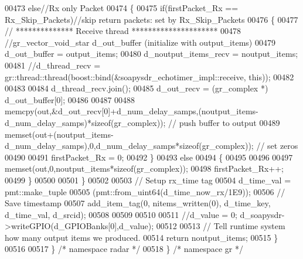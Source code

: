 \begin{DoxyCode}
00473       \textcolor{keywordflow}{else}\textcolor{comment}{//Rx only Packet}
00474       \{
00475         \textcolor{keywordflow}{if}(firstPacket_Rx == Rx_Skip_Packets)\textcolor{comment}{//skip return packets: set by Rx\_Skip\_Packets}
00476         \{
00477           \textcolor{comment}{// ************** Receive thread *********************}
00478           \textcolor{comment}{//gr\_vector\_void\_star d\_out\_buffer (initialize with output\_items)}
00479           d_out_buffer = output\_items;
00480           d_noutput_items_recv = noutput\_items;
00481           \textcolor{comment}{//d\_thread\_recv = gr::thread::thread(boost::bind(&soapysdr\_echotimer\_impl::receive, this));}
00482 
00483 
00484           d_thread_recv.join();
00485           d_out_recv = (gr\_complex *) d_out_buffer[0];
00486 
00487 
00488           memcpy(out,&d_out_recv[0]+d_num_delay_samps,(noutput\_items-
      d_num_delay_samps)*\textcolor{keyword}{sizeof}(gr\_complex)); \textcolor{comment}{// push buffer to output}
00489           memset(out+(noutput\_items-d_num_delay_samps),0,d_num_delay_samps*\textcolor{keyword}{sizeof}(gr\_complex)); \textcolor{comment}{// set
       zeros}
00490 
00491           firstPacket_Rx = 0;
00492         \}
00493         \textcolor{keywordflow}{else}
00494         \{
00495 
00496 
00497           memset(out,0,noutput\_items*\textcolor{keyword}{sizeof}(gr\_complex));
00498           firstPacket_Rx++;
00499         \}
00500 
00501       \}
00502 
00503       \textcolor{comment}{// Setup rx\_time tag}
00504       d_time_val = pmt::make\_tuple
00505       (pmt::from\_uint64(d_time_now_rx/1E9));
00506       \textcolor{comment}{// Save timestamp}
00507       add\_item\_tag(0, nitems\_written(0), d_time_key, d_time_val, d_srcid);
00508 
00509 
00510 
00511       \textcolor{comment}{//d\_value = 0; d\_soapysdr->writeGPIO(d\_GPIOBanks[0],d\_value);}
00512 
00513       \textcolor{comment}{// Tell runtime system how many output items we produced.}
00514       \textcolor{keywordflow}{return} noutput\_items;
00515     \}
00516 
00517   \} \textcolor{comment}{/* namespace radar */}
00518 \} \textcolor{comment}{/* namespace gr */}
\end{DoxyCode}
